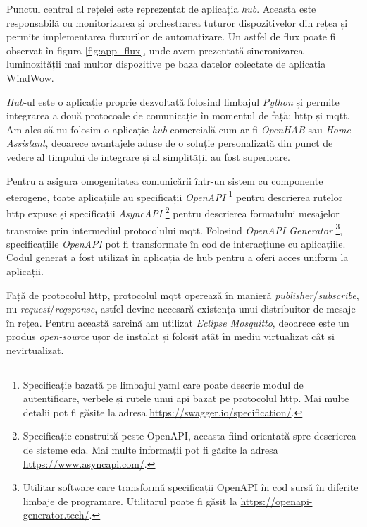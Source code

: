 Punctul central al rețelei este reprezentat de aplicația \textit{hub}. Aceasta este responsabilă cu monitorizarea și orchestrarea tuturor dispozitivelor din rețea și permite implementarea fluxurilor de automatizare. Un astfel de flux poate fi observat în figura \ref{fig:app_flux}, unde avem prezentată sincronizarea luminozității mai multor dispozitive pe baza datelor colectate de aplicația WindWow. 

\textit{Hub}-ul este o aplicație proprie dezvoltată folosind limbajul \textit{Python} și permite integrarea a două protocoale de comunicație în momentul de față: \acrshort{http} și \acrshort{mqtt}. Am ales să nu folosim o aplicație \textit{hub} comercială cum ar fi \textit{OpenHAB} sau \textit{Home Assistant}, deoarece avantajele aduse de o soluție personalizată din punct de vedere al timpului de integrare și al simplității au fost superioare.

Pentru a asigura omogenitatea comunicării într-un sistem cu componente eterogene, toate aplicațiile au specificații \textit{OpenAPI} \footnote{Specificație bazată pe limbajul \acrshort{yaml} care poate descrie modul de autentificare, verbele și rutele unui \acrshort{api} bazat pe protocolul \acrshort{http}. Mai multe detalii pot fi găsite la adresa \url{https://swagger.io/specification/}.} pentru descrierea rutelor \acrshort{http} expuse și specificații \textit{AsyncAPI} \footnote{Specificație construită peste OpenAPI, aceasta fiind orientată spre descrierea de sisteme \acrshort{eda}. Mai multe informații pot fi găsite la adresa \url{https://www.asyncapi.com/}.} pentru descrierea formatului mesajelor transmise prin intermediul protocolului \acrshort{mqtt}. Folosind \textit{OpenAPI Generator} \footnote{Utilitar software care transformă specificații OpenAPI în cod sursă în diferite limbaje de programare. Utilitarul poate fi găsit la \url{https://openapi-generator.tech/}.}, specificațiile \textit{OpenAPI} pot fi transformate în cod de interacțiune cu aplicațiile. Codul generat a fost utilizat în aplicația de hub pentru a oferi acces uniform la aplicații.

Față de protocolul \acrshort{http}, protocolul \acrshort{mqtt} operează în manieră \textit{publisher}/\textit{subscribe}, nu \textit{request}/\textit{reqsponse}, astfel devine necesară existența unui distribuitor de mesaje în rețea. Pentru această sarcină am utilizat \textit{Eclipse Mosquitto}, deoarece este un produs \textit{open-source} ușor de instalat și folosit atât în mediu virtualizat cât și nevirtualizat.

